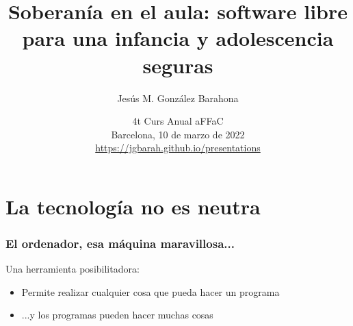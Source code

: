 \documentclass[17pt,aspectratio=169]{beamer}
\renewcommand{\secimage}{figs/bookpages}
\newcommand{\secimage}{figs/bookpages}
\begin{document}
\title{Soberanía en el aula: software libre para una infancia y adolescencia seguras}
\author{Jesús M. González Barahona}

\date{4t Curs Anual aFFaC \\
  Barcelona, 10 de marzo de 2022 \\
{\small \url{https://jgbarah.github.io/presentations}} \\}

\frame{
\maketitle
}





\renewcommand{\secimage}{figs/ordenador-bebe}


\section{La tecnología no es neutra}



\begin{frame}
\frametitle{El ordenador, esa máquina maravillosa...}

Una herramienta posibilitadora:

\begin{itemize}
\item Permite realizar cualquier cosa que pueda hacer un programa
\item ...y los programas pueden hacer muchas cosas
\end{itemize}


\end{frame}
\end{document}
